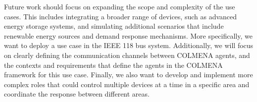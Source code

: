 \documentclass{article}
\begin{document}
Future work should focus on expanding the scope and complexity of the use cases. This includes integrating a broader range of devices, such as advanced energy storage systems, and simulating additional scenarios that include renewable energy sources and demand response mechanisms. More specifically, we want to deploy a use case in the IEEE 118 bus system. Additionally, we will focus on clearly defining the communication channels between COLMENA agents, and the contexts  and requirements that define the agents in the COLMENA framework for this use case. Finally, we also want to develop and implement more complex roles that could control multiple devices at a time in a specific area and coordinate the response between different areas.  


\nocite{*}
\printbibliography
\end{document}
